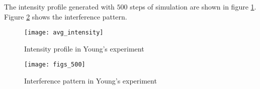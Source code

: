 \documentclass[11pt]{article}
\numberwithin{equation}{section}
\begin{document}
The intensity profile generated with $500$ steps of simulation are 
shown in figure \ref{f4}. Figure \ref{f5} shows the interference 
pattern.
\begin{figure}
\centering
\texttt{[image: avg\_intensity]}
\caption{Intensity profile in Young's experiment}\label{f4}
\end{figure}

\begin{figure}
\centering
\texttt{[image: figs\_500]}
\caption{Interference pattern in Young's experiment}\label{f5}
\end{figure}



\end{document}
